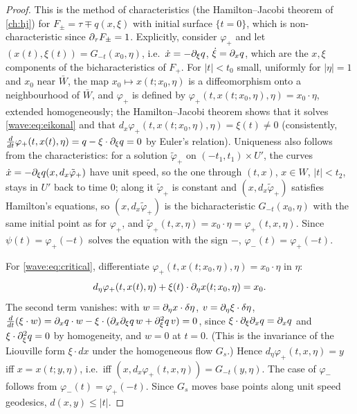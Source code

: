 \begin{proof}
This is the method of characteristics (the Hamilton--Jacobi theorem of
\cref{ch:hj}) for $F_\pm=\tau\mp q(x,\xi)$ with initial surface $\{t=0\}$, which is
non-characteristic since $\partial_\tau F_\pm=1$. Explicitly, consider $\varphi_+$ and let
$(x(t),\xi(t))=G_{-t}(x_0,\eta)$, i.e.\ $\dot x=-\partial_\xi q$, $\dot\xi=\partial_xq$, which are the
$x,\xi$ components of the bicharacteristics of $F_+$. For $|t|<t_0$ small, uniformly for
$|\eta|=1$ and $x_0$ near $\bar W$, the map $x_0\mapsto x(t;x_0,\eta)$ is a
diffeomorphism onto a neighbourhood of $\bar W$, and $\varphi_+$ is defined by
$\varphi_+(t,x(t;x_0,\eta),\eta)=x_0\cdot\eta$, extended homogeneously; the Hamilton--Jacobi
theorem shows that it solves \eqref{wave:eq:eikonal} and that
$d_x\varphi_+(t,x(t;x_0,\eta),\eta)=\xi(t)\ne0$ (consistently, $\frac d{dt}\varphi_+(t,x(t),\eta)
=q-\xi\cdot\partial_\xi q=0$ by Euler's relation). Uniqueness also follows from the
characteristics: for a solution $\tilde\varphi_+$ on $(-t_1,t_1)\times U'$, the curves
$\dot x=-\partial_\xi q(x,d_x\tilde\varphi_+)$ have unit speed, so the one through $(t,x)$,
$x\in W$, $|t|<t_2$, stays in $U'$ back to time $0$; along it $\tilde\varphi_+$ is constant
and $(x,d_x\tilde\varphi_+)$ satisfies Hamilton's equations, so $(x,d_x\tilde\varphi_+)$ is
the bicharacteristic $G_{-t}(x_0,\eta)$ with the same initial point as for $\varphi_+$, and
$\tilde\varphi_+(t,x,\eta)=x_0\cdot\eta=\varphi_+(t,x,\eta)$. Since $\psi(t)=\varphi_+(-t)$ solves the equation with the sign $-$,
$\varphi_-(t)=\varphi_+(-t)$.

For \eqref{wave:eq:critical}, differentiate $\varphi_+(t,x(t;x_0,\eta),\eta)=x_0\cdot\eta$ in
$\eta$:
\begin{equation*}
d_\eta\varphi_+(t,x(t),\eta)+\xi(t)\cdot\partial_\eta x(t;x_0,\eta)=x_0 .
\end{equation*}
The second term vanishes: with $w=\partial_\eta x\cdot\delta\eta$, $v=\partial_\eta\xi\cdot\delta\eta$,
$\frac d{dt}(\xi\cdot w)=\partial_xq\cdot w-\xi\cdot(\partial_x\partial_\xi q\,w+\partial_\xi^2q\,v)=0$, since
$\xi\cdot\partial_\xi\partial_xq=\partial_xq$ and $\xi\cdot\partial_\xi^2q=0$ by homogeneity, and $w=0$ at $t=0$.
(This is the invariance of the Liouville form $\xi\cdot dx$ under the homogeneous
flow $G_s$.) Hence $d_\eta\varphi_+(t,x,\eta)=y$ iff $x=x(t;y,\eta)$, i.e.\ iff
$(x,d_x\varphi_+(t,x,\eta))=G_{-t}(y,\eta)$. The case of $\varphi_-$ follows from
$\varphi_-(t)=\varphi_+(-t)$. Since $G_s$ moves base points along unit speed
geodesics, $d(x,y)\le|t|$.
\end{proof}

